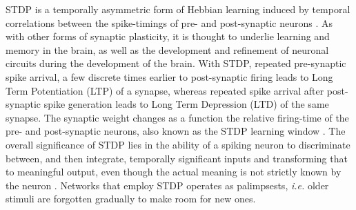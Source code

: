 STDP is a temporally asymmetric form of Hebbian learning induced by temporal correlations between the spike-timings of pre- and post-synaptic neurons \citep{song2000competitive}. As with other forms of synaptic plasticity, it is thought to underlie learning and memory in the brain, as well as the development and refinement of neuronal circuits during the development of the brain. With STDP, repeated pre-synaptic spike arrival, a few discrete times earlier to post-synaptic firing leads to Long Term Potentiation (LTP) of a synapse, whereas repeated spike arrival after post-synaptic spike generation leads to Long Term Depression (LTD) of the same synapse. The synaptic weight changes as a function the relative firing-time of the pre- and post-synaptic neurons, also known as the STDP learning window \citep{gerstner2002spiking}. The overall significance of STDP lies in the ability of a spiking neuron to discriminate between, and then integrate, temporally significant inputs and transforming that to meaningful output, even though the actual meaning is not strictly known by the neuron \citep{markram2011introducing}. Networks that employ STDP operates as palimpsests, \emph{i.e.} older stimuli are forgotten gradually to make room for new ones.

